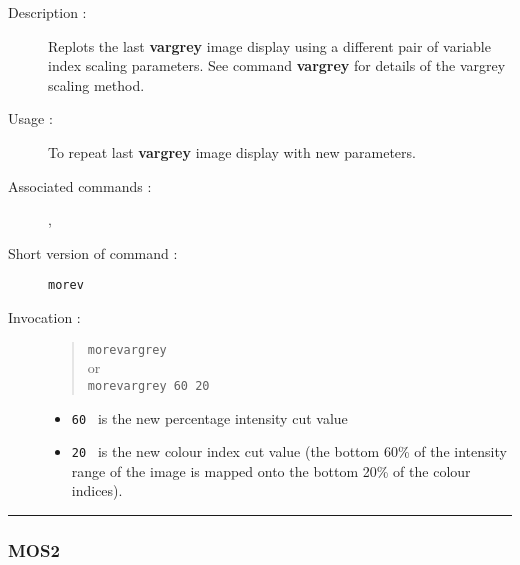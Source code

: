 \begin{description}

\item[Description :] Replots the last {\bf vargrey} image display using a
different pair of variable index scaling parameters.  See command
{\bf vargrey} for details of the vargrey scaling method.

\item[Usage :] To repeat last {\bf vargrey} image display with new parameters.
\item[Associated commands :] {\tt {}},
{\tt {}}
\item[Short version of command :] {\tt morev}
\item[Invocation :]

\begin{quote}{\tt  morevargrey }\\
or \\
{\tt morevargrey 60 20 }
\end{quote}

\begin{itemize}

\item {\tt 60 } is the new percentage intensity cut value

\item {\tt 20 } is the new colour index cut value
(the bottom 60\% of the intensity range of the image  is
mapped onto the bottom 20\% of the colour indices).

\end{itemize}

\end{description}

\hrule
\subsubsection*{\label{MOS2}MOS2}

